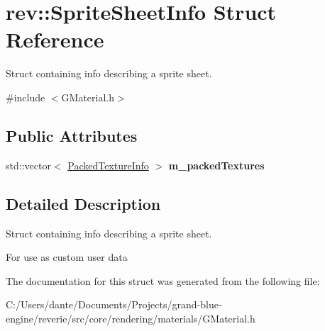 \hypertarget{structrev_1_1_sprite_sheet_info}{}\section{rev\+::Sprite\+Sheet\+Info Struct Reference}
\label{structrev_1_1_sprite_sheet_info}


Struct containing info describing a sprite sheet.  




{\ttfamily \#include $<$G\+Material.\+h$>$}

\subsection*{Public Attributes}
\begin{DoxyCompactItemize}
\item 
\mbox{\label{structrev_1_1_sprite_sheet_info_a069081295d57900bef955e25184913a5}} 
std\+::vector$<$ \mbox{\hyperlink{structrev_1_1_packed_texture_info}{Packed\+Texture\+Info}} $>$ {\bfseries m\+\_\+packed\+Textures}
\end{DoxyCompactItemize}


\subsection{Detailed Description}
Struct containing info describing a sprite sheet. 

For use as custom user data 

The documentation for this struct was generated from the following file\+:\begin{DoxyCompactItemize}
\item 
C\+:/\+Users/dante/\+Documents/\+Projects/grand-\/blue-\/engine/reverie/src/core/rendering/materials/G\+Material.\+h\end{DoxyCompactItemize}
